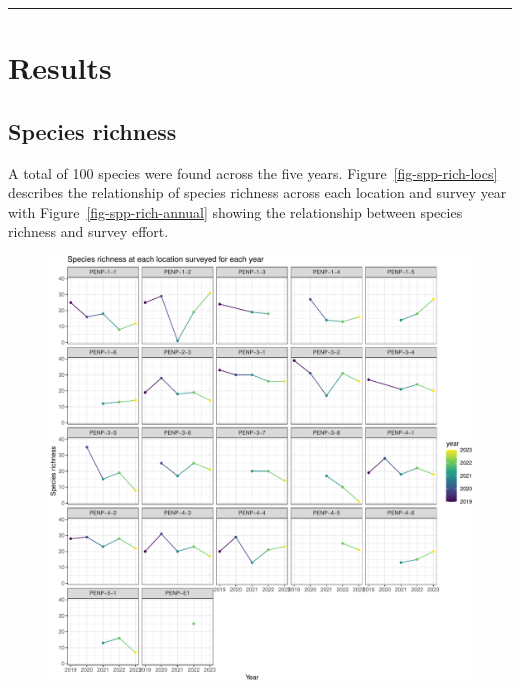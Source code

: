 \documentclass[
  letterpaper,
  DIV=11,
  numbers=noendperiod,
  oneside]{scrartcl}
\begin{document}
\begin{center}\rule{0.5\linewidth}{0.5pt}\end{center}

\hypertarget{results}{%
\section{Results}\label{results}}

\hypertarget{species-richness}{%
\subsection{Species richness}\label{species-richness}}

A total of 100 species were found across the five years.
Figure~\ref{fig-spp-rich-locs} describes the relationship of species
richness across each location and survey year with
Figure~\ref{fig-spp-rich-annual} showing the relationship between
species richness and survey effort.

\begin{figure}


{\centering \includegraphics{peinp_files/figure-pdf/fig-spp-rich-locs-1.pdf}

}

\end{figure}
\end{document}
